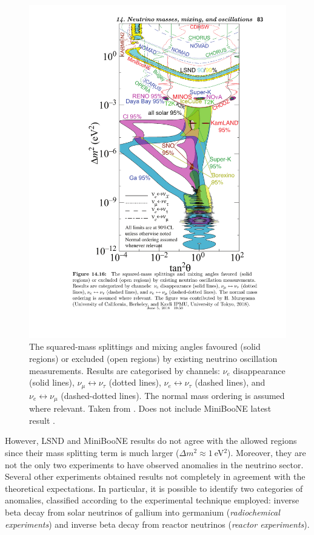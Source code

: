\begin{figure}[htbp]
    \centering
    \includegraphics[width=0.7\linewidth]{figures/globalfit.pdf}
    \caption{The squared-mass splittings and mixing angles favoured (solid regions) or excluded (open regions) by existing neutrino oscillation measurements. Results are categorised by channels: $\nu_e$ disappearance (solid lines), $\nu_{\mu} \leftrightarrow \nu_{\tau}$  (dotted lines), $\nu_{e} \leftrightarrow \nu_{\tau}$ (dashed lines), and $\nu_{e} \leftrightarrow \nu_{\mu}$ (dashed-dotted lines). The normal mass ordering is assumed where relevant. Taken from \cite{PhysRevD.98.030001}. Does not include MiniBooNE latest result \cite{Aguilar-Arevalo:2018gpe}.}
    \label{fig:globalfit}
\end{figure}

However, LSND and MiniBooNE results do not agree with the allowed regions since their mass splitting term is much larger ($\Delta m^2 \approx1~$eV$^2$). Moreover, they are not the only two experiments to have observed anomalies in the neutrino sector. Several other experiments obtained results not completely in agreement with the theoretical expectations. In particular, it is possible to identify two categories of anomalies, classified according to the experimental technique employed: inverse beta decay from solar neutrinos of gallium into germanium (\emph{radiochemical experiments}) and inverse beta decay from reactor neutrinos (\emph{reactor experiments}).

